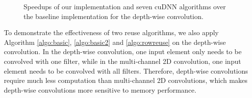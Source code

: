 \begin{figure}
\centering
	

\caption{Speedups of our implementation and seven cuDNN algorithms over the baseline implementation for the depth-wise convolution.}
\label{fig:3druntime}
\end{figure}


To demonstrate the effectiveness of two reuse algorithms, we also apply Algorithm \ref{algo:basic}, \ref{algo:basic2} and \ref{algo:rowreuse} on the depth-wise convolution. In the depth-wise convolution, one input element only needs to be convolved with one filter, while in the multi-channel 2D convolution, one input element needs to be convolved with all filters. Therefore, depth-wise convolutions require much less computation than multi-channel 2D convolutions, which makes depth-wise convolutions more sensitive to memory performance.



